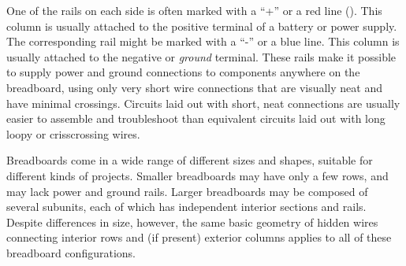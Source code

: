 One of the rails on each side is often marked with a ``+'' or a red line (). 
This column is usually attached to the positive terminal of a battery or power supply.
The corresponding rail might be marked with a ``-'' or a blue line.
This column is usually attached to the negative or \emph{ground} terminal. 
These rails make it possible to supply power and ground connections to components anywhere on the breadboard, using only very short wire connections that are visually neat and have minimal crossings. 
Circuits laid out with short, neat connections are usually easier to assemble and troubleshoot than equivalent circuits laid out with long loopy or crisscrossing wires.

Breadboards come in a wide range of different sizes and shapes, suitable for different kinds of projects. 
Smaller breadboards may have only a few rows, and may lack power and ground rails. 
Larger breadboards may be composed of several subunits, each of which has independent interior sections and rails.  
Despite differences in size, however, the same basic geometry of hidden wires connecting interior rows and (if present) exterior columns applies to all of these breadboard configurations.

